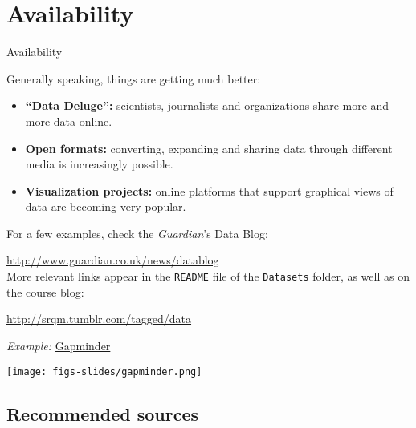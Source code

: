 \documentclass{beamer}
\begin{document}
	
	\section{Availability}

	\begin{frame}[t]{Availability}
	
	Generally speaking, things are getting much better:

		\begin{itemize}
		\item \textbf{``Data Deluge'':} scientists, journalists and organizations share more and more data online.

		\item \textbf{Open formats:} converting, expanding and sharing data through different media is increasingly possible.
		
		\item \textbf{Visualization projects:} online platforms that support graphical views of data are becoming very popular.
				
		\end{itemize}
	
		For a few examples, check the \textit{Guardian}'s Data Blog:
		
		\url{http://www.guardian.co.uk/news/datablog}\\[1em]
		
		More relevant links appear in the \texttt{README} file of the \texttt{Datasets} folder, as well as on the course blog:
				
		\url{http://srqm.tumblr.com/tagged/data}
	
	\end{frame}
	
	\begin{frame}[t]{\textit{Example:} \href{http://www.gapminder.org/}{Gapminder}}

	\texttt{[image: figs-slides/gapminder.png]}

	\end{frame}
	
	\subsection{Recommended sources}
\end{document}
